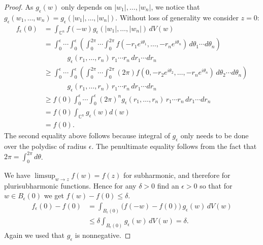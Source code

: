 \documentclass[12pt,openany]{book}
\newcommand{\sabs}[1]{\lvert {#1} \rvert}
\newcommand{\C}{{\mathbb{C}}}
\theoremstyle{plain}
\theoremstyle{remark}
\theoremstyle{definition}
\theoremstyle{exercise}
\theoremstyle{example}
\begin{document}
\begin{proof}
As $g_\epsilon(w)$ only depends on $\sabs{w_1},\ldots,\sabs{w_n}$, we notice
that
$g_\epsilon(w_1,\ldots,w_n) =
g_\epsilon(\sabs{w_1},\ldots,\sabs{w_n})$.
Without loss of generality we consider $z=0$:
\begin{equation*}
\begin{split}
f_\epsilon(0)
& =
\int_{\C^n} f(-w) g_\epsilon (\sabs{w_1},\ldots,\sabs{w_n})
\, dV(w)
\\
& =
\int_0^\epsilon \cdots
\int_0^\epsilon
\left(
\int_0^{2\pi}
\cdots
\int_0^{2\pi}
 f(-r_1e^{i\theta_1},\ldots,
-r_ne^{i\theta_n}) \,
d\theta_1 \cdots d\theta_n \right)
\\
& \phantom{=}\qquad
g_\epsilon (r_1,\ldots,r_n) \,
 r_1 \cdots r_n \,d r_1 \cdots d r_n
\\
& \geq
\int_0^\epsilon \cdots
\int_0^\epsilon
\left(
\int_0^{2\pi}
\cdots
\int_0^{2\pi}
(2\pi)
 f(0,-r_2e^{i\theta_2},\ldots,
-r_ne^{i\theta_n}) \,
d\theta_2 \cdots d\theta_n \right)
\\
& \phantom{=}\qquad
g_\epsilon (r_1,\ldots,r_n) \,
 r_1 \cdots r_n \,d r_1 \cdots d r_n
\\
& \geq
f(0)
\int_0^\epsilon \cdots
\int_0^\epsilon
{(2\pi)}^n
g_\epsilon (r_1,\ldots,r_n) \,
 r_1 \cdots r_n \,d r_1 \cdots d r_n
\\
& = f(0) \int_{\C^n} g_\epsilon (w) d(w)
\\
& = f(0) .
\end{split}
\end{equation*}
The second equality above
follows because integral of $g_\epsilon$ only needs to be
done over the polydisc of radius $\epsilon$.
The penultimate equality follows from the fact that
$2\pi = \int_0^{2\pi}d \theta$.

We have $\limsup_{w\to z} f(w) = f(z)$ for subharmonic,
and therefore for plurisubharmonic functions.
Hence
for any $\delta >0$ find an $\epsilon
>0$ so that for $w \in B_\epsilon(0)$ we get $f(w)-f(0) \leq \delta$.
\begin{equation*}
\begin{split}
f_\epsilon(0) - f(0)
& =
\int_{B_\epsilon(0)} \bigl(f(-w)-f(0)\bigr)\, g_\epsilon (w)
\, dV(w)
\\
& \leq
\delta
\int_{B_\epsilon(0)} g_\epsilon (w)
\, dV(w)
= \delta .
\end{split}
\end{equation*}
Again we used that $g_\epsilon$ is nonnegative.
\end{proof}
\end{document}
